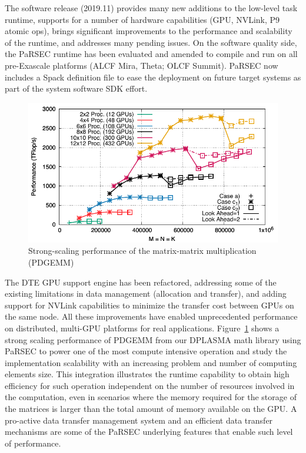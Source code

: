 The software release (2019.11) provides many new additions to the low-level task
runtime, supports for a number of hardware capabilities (GPU, NVLink, P9 atomic
ops), brings significant improvements to the performance and scalability of the
runtime, and addresses many pending issues.
%
%
On the software quality side, the PaRSEC runtime has been evaluated and amended
to compile and run on all pre-Exascale platforms (ALCF Mira, Theta; OLCF
Summit). PaRSEC now includes a Spack definition file to ease the deployment on
future target systems as part of the system software SDK effort.

\begin{figure}
\centering\includegraphics[scale=0.55]{projects/2.3.1-PMR/2.3.1.09-ParSEC/gemm_summit_mean.pdf}
\caption{Strong-scaling performance of the matrix-matrix multiplication
(PDGEMM)\label{fig:PDGEMM}} \end{figure} The DTE GPU support engine has been
refactored, addressing some of the existing limitations in data management
(allocation and transfer), and adding support for NVLink capabilities to
minimize the transfer cost between GPUs on the same node. All these improvements
have enabled unprecedented performance on distributed, multi-GPU platforms for
real applications.
%
Figure~\ref{fig:PDGEMM} shows a strong scaling performance of PDGEMM from our
DPLASMA math library using PaRSEC to power one of the most compute intensive
operation and study the implementation scalability with an increasing problem
and number of computing elements size. This integration illustrates the runtime
capability to obtain high efficiency for such operation independent on the
number of resources involved in the computation, even in scenarios where the
memory required for the storage of the matrices is larger than the total amount
of memory available on the GPU. A pro-active data transfer management system and
an efficient data transfer mechanisms are some of the PaRSEC underlying features
that enable such level of performance.

